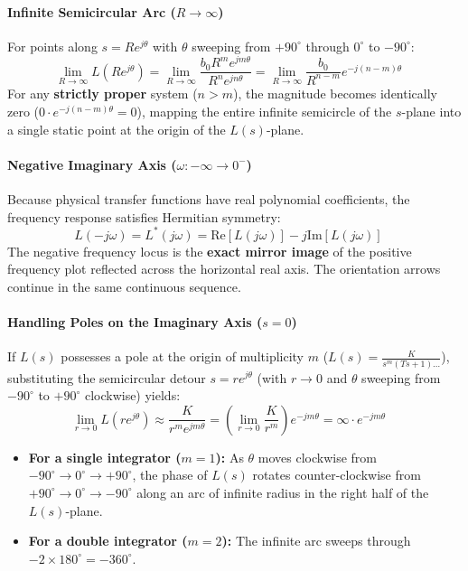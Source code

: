 \documentclass[12pt,onecolumn,twoside ]{article}
\begin{document}
	\paragraph{Infinite Semicircular Arc ($R \to \infty$)}
	For points along $s = R e^{j\theta}$ with $\theta$ sweeping from $+90^\circ$ through $0^\circ$ to $-90^\circ$: \[
	\lim_{R \to \infty} L(R e^{j\theta}) = \lim_{R \to \infty} \frac{b_0 R^m e^{jm\theta}}{R^n e^{jn\theta}} = \lim_{R \to \infty} \frac{b_0}{R^{n-m}} e^{-j(n-m)\theta} \quad
	\] For any \textbf{strictly proper} system ($n > m$), the magnitude becomes identically zero ($0 \cdot e^{-j(n-m)\theta} = 0$), mapping the entire infinite semicircle of the $s$-plane into a single static point at the origin of the $L(s)$-plane.
	\paragraph{Negative Imaginary Axis ($\omega: -\infty \to 0^-$)}
	Because physical transfer functions have real polynomial coefficients, the frequency response satisfies Hermitian symmetry: \[
	L(-j\omega) = L^*(j\omega) = \text{Re}[L(j\omega)] - j \text{Im}[L(j\omega)] \quad
	\] The negative frequency locus is the \textbf{exact mirror image} of the positive frequency plot reflected across the horizontal real axis. The orientation arrows continue in the same continuous sequence.
	\paragraph{Handling Poles on the Imaginary Axis ($s = 0$)}
	If $L(s)$ possesses a pole at the origin of multiplicity $m$ ($L(s) = \frac{K}{s^m (Ts + 1)\dots}$), substituting the semicircular detour $s = r e^{j\theta}$ (with $r \to 0$ and $\theta$ sweeping from $-90^\circ$ to $+90^\circ$ clockwise) yields: \[
	\lim_{r \to 0} L(r e^{j\theta}) \approx \frac{K}{r^m e^{jm\theta}} = \left(\lim_{r \to 0} \frac{K}{r^m}\right) e^{-jm\theta} = \infty \cdot e^{-jm\theta} \quad
	\]
	\begin{itemize}
		\item
		\textbf{For a single integrator ($m = 1$):} As $\theta$ moves clockwise from $-90^\circ \to 0^\circ \to +90^\circ$, the phase of $L(s)$ rotates counter-clockwise from $+90^\circ \to 0^\circ \to -90^\circ$ along an arc of infinite radius in the right half of the $L(s)$-plane.
		\item
		\textbf{For a double integrator ($m = 2$):} The infinite arc sweeps through $-2 \times 180^\circ = -360^\circ$.
	\end{itemize}
\end{document}
